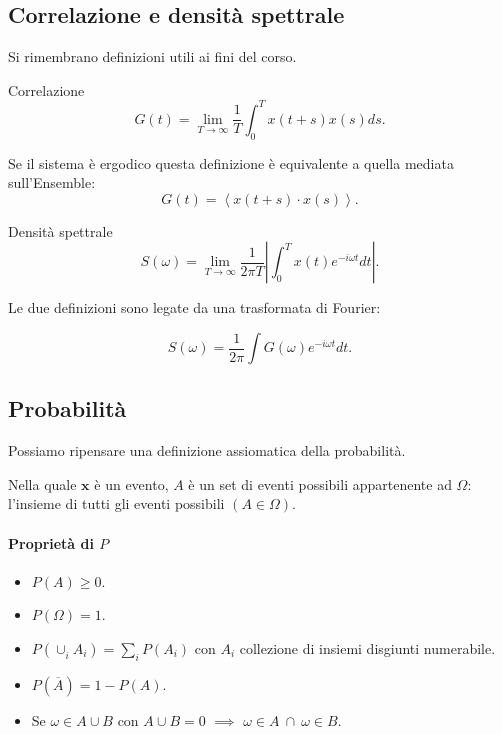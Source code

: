 \subsection{Correlazione e densità spettrale}%
\label{sub:Correlazione e densità spettrale}
Si rimembrano definizioni utili ai fini del corso. 
\begin{bluebox}{Correlazione}
    \[
        G\left(t\right)=\lim_{T \to \infty} \frac{1}{T}\int_{0}^{T} x\left(t+s\right) x\left(s\right)ds
    .\] 
\end{bluebox}
\noindent
Se il sistema è ergodico questa definizione è equivalente a quella mediata sull'Ensemble:
\[
    G( t) = \left<x(t+s) \cdot  x(s)\right>
.\] 
\begin{bluebox}{Densità spettrale}
    \[
        S\left(\omega\right) = \lim_{T \to \infty} \frac{1}{2\pi T}\left|\int_{0}^{T} x\left(t\right)e^{-i\omega t}dt \right|
    .\] 
\end{bluebox}
\noindent
Le due definizioni sono legate da una trasformata di Fourier: 
\begin{bluebox}{}
    \[
        S\left(\omega\right) = \frac{1}{2\pi}\int G\left(\omega\right)e^{-i\omega t}dt
    .\] 
\end{bluebox}



\subsection{Probabilità}%
\label{sub:Probabilità}
Possiamo ripensare una definizione assiomatica della probabilità.

Nella quale $\boldsymbol{x}$ è un evento, $A$ è un set di eventi possibili appartenente ad $\Omega$: l'insieme di tutti gli eventi possibili $(A \in \Omega)$.
\paragraph{Proprietà di $P$ }%
\label{par:Proprietà di P}
\begin{itemize}
    \item $P\left(A\right)\ge 0$.
    \item $P\left(\Omega\right) = 1$.
    \item $P\left(\cup_{i}^{} A_i \right) = \sum_{i}^{} P\left(A_i\right)$ con $A_i$ collezione di insiemi disgiunti numerabile.
    \item $P\left(\overline{A}\right) = 1- P\left(A\right)$.
    \item Se $\omega \in A \cup B$ con $A \cup B = 0$ $\implies$ $\omega\in A \ \cap \ \omega  \in B$.
\end{itemize}
